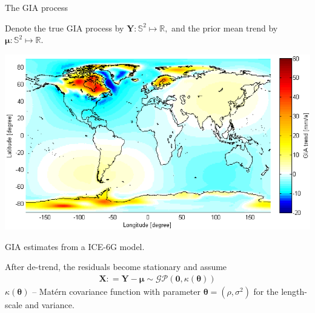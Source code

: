 \documentclass{beamer}
\begin{document}
\begin{frame}{The GIA process}

\vspace{0.3cm}
\begin{minipage}[c]{0.45\textwidth}
Denote the true GIA process by 
$\bm{Y}: \mathbb{S}^2 \mapsto \mathbb{R},$
and the prior mean trend by
$\bm{\mu}: \mathbb{S}^2 \mapsto \mathbb{R}$.
\end{minipage}%
\hfill
\begin{minipage}[c]{0.5\textwidth}
\centering
\includegraphics[width = \textwidth, clip]{images/ice6g}

\tiny{GIA estimates from a ICE-6G model.}
\end{minipage}

\vspace{0.3cm}
After de-trend, the residuals become stationary and assume
\begin{align}\label{eq:GIAresid}
 \bm{X}: = \bm{Y} - \bm{\mu} \sim \mathcal{GP}(\bm{0}, \kappa(\bm{\theta}))
\end{align}
$\kappa(\bm{\theta})$ -- Mat{\'e}rn covariance function with parameter $\bm{\theta} = (\rho, \sigma^2)$ for the length-scale and variance.

\end{frame}
\end{document}
